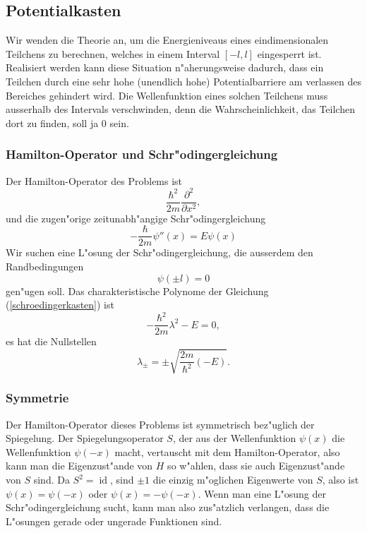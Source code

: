 \subsection{Potentialkasten\label{subsection:potentialkasten}}
Wir wenden die Theorie an, um die Energieniveaus eines eindimensionalen
Teilchens zu berechnen, welches in einem Interval $[-l,l]$ eingesperrt ist.
Realisiert werden kann diese Situation n"aherungsweise dadurch, dass 
ein Teilchen durch eine sehr hohe (unendlich hohe) Potentialbarriere
am verlassen des Bereiches gehindert wird.
Die Wellenfunktion eines solchen Teilchens muss ausserhalb des Intervals
verschwinden, denn die Wahrscheinlichkeit, das Teilchen dort zu
finden, soll ja $0$ sein.

\subsubsection{Hamilton-Operator und Schr"odingergleichung}
Der Hamilton-Operator des Problems ist
\[
\frac{\hbar^2}{2m}\frac{\partial^2}{\partial x^2},
\]
und die zugen"orige zeitunabh"angige Schr"odingergleichung
\begin{equation}
-\frac{\hbar}{2m}\psi''(x)=E\psi(x)
\label{schroedingerkasten}
\end{equation}
Wir suchen eine L"osung der Schr"odingergleichung,
die ausserdem den Randbedingungen
\[
\psi(\pm l)=0
\]
gen"ugen soll.
Das charakteristische Polynome der Gleichung (\ref{schroedingerkasten}) ist
\[
-\frac{\hbar^2}{2m}\lambda^2-E=0,
\]
es hat die Nullstellen
\[
\lambda_\pm = \pm\sqrt{\frac{2m}{\hbar^2}(-E)}.
\]

\subsubsection{Symmetrie}
Der Hamilton-Operator dieses Problems ist symmetrisch bez"uglich
der Spiegelung.
Der Spiegelungsoperator $S$, der aus der Wellenfunktion
$\psi(x)$ die Wellenfunktion $\psi(-x)$ macht, vertauscht mit
dem Hamilton-Operator, also kann man die Eigenzust"ande von $H$ so w"ahlen,
dass sie auch Eigenzust"ande von $S$ sind.
Da $S^2=\operatorname{id}$, sind $\pm1$ die einzig m"oglichen Eigenwerte
von $S$, also ist $\psi(x)=\psi(-x)$ oder $\psi(x)=-\psi(-x)$.
Wenn man eine L"osung der Schr"odingergleichung sucht, kann man also
zus"atzlich verlangen, dass die L"osungen gerade oder ungerade Funktionen
sind.

